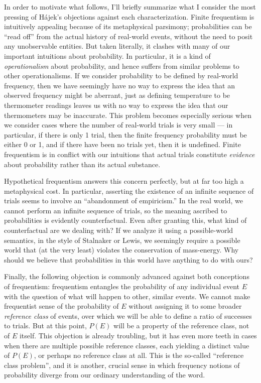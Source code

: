 \documentclass[letterpaper,12pt]{article}
\newcommand{\hajek}{H\'ajek}
\begin{document}
In order to motivate what follows, I'll briefly summarize what I consider the most pressing of \hajek's objections against each characterization. Finite frequentism is intuitively appealing because of its metaphysical parsimony; probabilities can be ``read off'' from the actual history of real-world events, without the need to posit any unobservable entities. But taken literally, it clashes with many of our important intuitions about probability. In particular, it is a kind of \emph{operationalism} about probability, and hence suffers from similar problems to other operationalisms. If we consider probability to be defined by real-world frequency, then we have seemingly have no way to express the idea that an observed frequency might be aberrant, just as defining temperature to be thermometer readings leaves us with no way to express the idea that our thermometers may be inaccurate. This problem becomes especially serious when we consider cases where the number of real-world trials is very small --- in particular, if there is only 1 trial, then the finite frequency probability must be either 0 or 1, and if there have been no trials yet, then it is undefined. Finite frequentism is in conflict with our intuitions that actual trials constitute \emph{evidence} about probability rather than its actual substance.

Hypothetical frequentism answers this concern perfectly, but at far too high a metaphysical cost. In particular, asserting the existence of an infinite sequence of trials seems to involve an ``abandonment of empiricism.'' In the real world, we cannot perform an infinite sequence of trials, so the meaning ascribed to probabilities is evidently counterfactual. Even after granting this, what kind of counterfactual are we dealing with? If we analyze it using a possible-world semantics, in the style of Stalnaker or Lewis, we seemingly require a possible world that (at the very least) violates the conservation of mass-energy. Why should we believe that probabilities in this world have anything to do with ours?

Finally, the following objection is commonly advanced against both conceptions of frequentism: frequentism entangles the probability of any individual event $E$ with the question of what will happen to other, similar events. We cannot make frequentist sense of the probability of $E$ without assigning it to some broader \emph{reference class} of events, over which we will be able to define a ratio of successes to trials. But at this point, $P(E)$ will be a property of the reference class, not of $E$ itself. This objection is already troubling, but it has even more teeth in cases when there are multiple possible reference classes, each yielding a distinct value of $P(E)$, or perhaps no reference class at all. This is the so-called ``reference class problem'', and it is another, crucial sense in which frequency notions of probability diverge from our ordinary understanding of the word.
\end{document}

